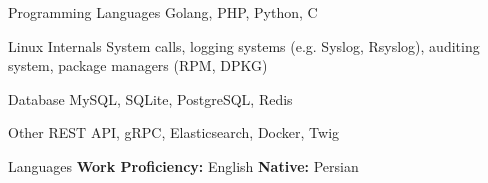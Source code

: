 

\begin{cvskills}


  \cvskill
    {Programming Languages} %
    {Golang, PHP, Python, C} %

  \cvskill
    {Linux Internals} %
    {System calls, logging systems (e.g. Syslog, Rsyslog), auditing system, package managers (RPM, DPKG)} %

  \cvskill
    {Database} %
    {MySQL, SQLite, PostgreSQL, Redis} %

  \cvskill
    {Other} %
    {REST API, gRPC, Elasticsearch, Docker, Twig} %

  \cvskill
    {Languages} %
    {\textbf{Work Proficiency:} English \qquad \textbf{Native:} Persian} %

\end{cvskills}
